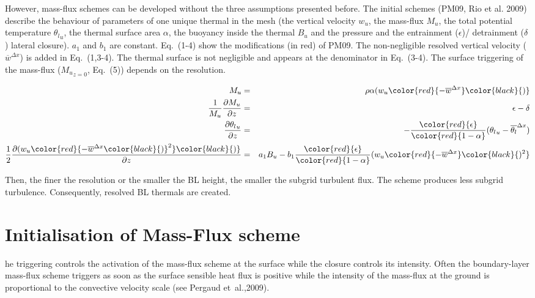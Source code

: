 However, mass-flux schemes can be developed without the three assumptions presented before. The initial schemes (PM09, Rio et al. 2009) describe the behaviour of parameters of one unique thermal in the mesh (the vertical velocity $w_u$, the mass-flux $M_u$, the total potential temperature ${\theta_l}_u$, the thermal surface area $\alpha$, the buoyancy inside the thermal $B_u$ and the pressure and the entrainment ($\epsilon$)/ detrainment ($\delta$) lateral closure). $a_1$ and $b_1$ are constant. 
Eq.~(1-4) show the modifications (in red) of PM09. The non-negligible resolved vertical velocity ($\overline{w}^{\Delta x}$) is added in Eq.~(1,3-4). The thermal surface is not negligible and appears at the denominator in Eq.~(3-4). The surface triggering of the mass-flux (${M_u}_{z=0}$, Eq.~(5)) depends on the resolution.  

\begin{eqnarray}
	M_u&=&\rho\alpha(w_u\color{red}{-\overline{w}^{\Delta x}}\color{black}{)}\\
	\frac{1}{M_u}\frac{\partial M_u}{\partial z}&=&\epsilon-\delta\\
	\frac{\partial {\theta_l}_u}{\partial z}&=&-\frac{\color{red}{\epsilon}}{\color{red}{1-\alpha}}({\theta_l}_u -\overline{\theta_l}^{\Delta x})\\
	\frac{1}{2}\frac{\partial (w_u\color{red}{-\overline{w}^{\Delta x}\color{black}{)}^2}\color{black}{)}}{\partial z}&=&a_1B_u-b_1\frac{\color{red}{\epsilon}}{\color{red}{1-\alpha}}(w_u\color{red}{-\overline{w}^{\Delta x}}\color{black}{)^2}\\
\end{eqnarray}

Then, the finer the resolution or the smaller the BL height, the smaller the subgrid turbulent flux. The scheme produces less subgrid turbulence. Consequently, resolved BL thermals are created.

\section{Initialisation of Mass-Flux scheme}


he triggering controls the activation of the mass-flux scheme at the surface while the closure controls its intensity. Often the boundary-layer mass-flux scheme triggers as soon as the surface sensible heat flux is positive while the intensity of the mass-flux at the ground is proportional to the convective velocity scale (see Pergaud et~al.,2009). 

